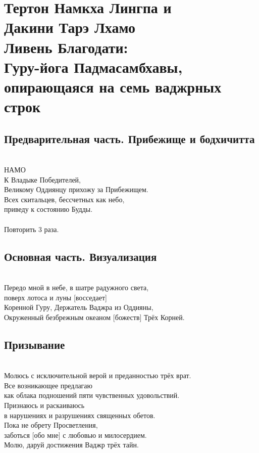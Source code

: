 \section{Тертон Намкха Лингпа и \\ Дакини Тарэ Лхамо
 \\Ливень Благодати:\\Гуру-йога Падмасамбхавы, \\опирающаяся на семь ваджрных строк}

\subsection{Предварительная часть. Прибежище и бодхичитта}
\\
НАМО\\
К Владыке Победителей, \\
\indent Великому Оддиянцу прихожу за Прибежищем.\\
Всех скитальцев, бессчетных как небо, \\
\indent приведу к состоянию Будды.\\
\\
Повторить 3 раза.\\

\subsection{Основная часть. Визуализация}
\\
Передо мной в небе, в шатре радужного света, \\ \indent поверх лотоса и луны [восседает]\\
Коренной Гуру, Держатель Ваджра из Оддияны,\\
Окруженный безбрежным океаном [божеств] Трёх Корней.\\

\subsection*{Призывание}
\\
Молюсь с исключительной верой и преданностью трёх врат.\\
Все возникающее предлагаю \\ \indent как облака подношений пяти чувственных удовольствий.\\
Признаюсь и раскаиваюсь \\ \indent в нарушениях и разрушениях священных обетов.\\
Пока не обрету Просветления, \\ \indent заботься [обо мне] с любовью и милосердием.\\
Молю, даруй достижения Ваджр трёх тайн.\\

